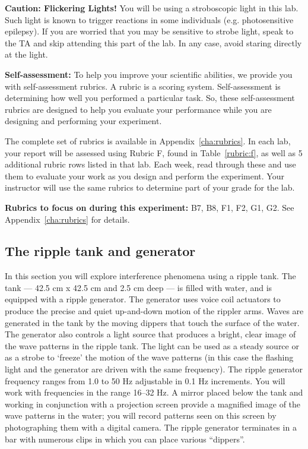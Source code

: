 \begin{framed}
	\textbf{Caution: Flickering Lights!} You will be using a stroboscopic light in this lab. Such light is known to trigger reactions in some individuals (e.g. photosensitive epilepsy).
	If you are worried that you may be sensitive to strobe light, speak to the TA and skip attending this part of the lab.
	In any case, avoid staring directly at the light.
\end{framed}

\begin{framed}
	\textbf{Self-assessment:} To help you improve your scientific abilities, we provide you with self-assessment rubrics.
	A rubric is a scoring system.
	Self-assessment is determining how well you performed a particular task.
	So, these self-assessment rubrics are designed to help you evaluate your performance while you are designing and performing your experiment.
	
	The complete set of rubrics is available in Appendix~\ref{cha:rubrics}.
	In each lab, your report will be assessed using Rubric F, found in Table~\ref{rubric:f}, as well as 5 additional rubric rows listed in that lab.
	Each week, read through these and use them to evaluate your work as you design and perform the experiment.
	Your instructor will use the same rubrics to determine part of your grade for the lab.
\end{framed}	

\textbf{Rubrics to focus on during this experiment:} B7, B8, F1, F2, G1, G2. See Appendix~\ref{cha:rubrics} for details.

\subsection{The ripple tank and generator}

In this section you will explore interference phenomena using a ripple tank. The tank --- 42.5 cm x 42.5 cm and 2.5
cm deep --- is filled with water, and is equipped with a ripple generator. The generator uses voice coil actuators to
produce the precise and quiet up-and-down motion of the rippler arms. Waves are generated in the tank by the moving
dippers that touch the surface of the water. The generator also controls a light source that produces a bright, clear
image of the wave patterns in the ripple tank. The light can be used as a steady source or as a strobe to ‘freeze’ the
motion of the wave patterns (in this case the flashing light and the generator are driven with the same frequency). The
ripple generator frequency ranges from 1.0 to 50 Hz adjustable in 0.1 Hz increments. You will work with frequencies in
the range 16--32 Hz. A mirror placed below the tank and working in conjunction with a projection screen provide a
magnified image of the wave patterns in the water; you will record patterns seen on this screen by photographing them
with a digital camera. The ripple generator terminates in a bar with numerous clips in which you can place various
``dippers''.

